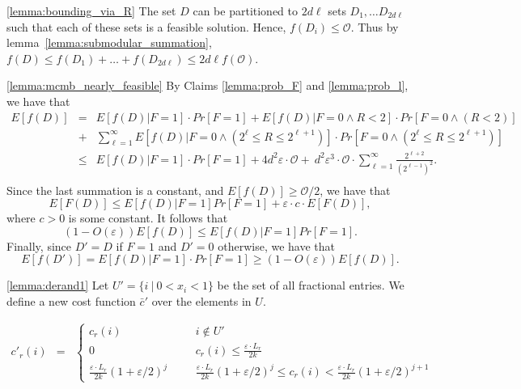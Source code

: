 \documentclass[11pt]{article}
\newcommand{\eps}{\varepsilon}
\newcommand{\bc}{\bar{c}}
\newcommand{\mO}{\mathcal{O}}
\newcommand{\Prb}[1]{{Pr\left[ #1\right] }}
\newenvironment{dl_proof}[1]{\noindent{\bf Proof of Lemma #1:}}{
 \hspace*{\fill} $\Box$ \vskip \belowdisplayskip}
\newenvironment{dl_claim_proof}[1]{\noindent{\bf Proof of Claim #1:}}{
 \hspace*{\fill} $\Box$ \vskip \belowdisplayskip}
\begin{document}
{\begin{dl_claim_proof}{\ref{lemma:bounding_via_R}}
The set $D$ can be partitioned to $2 d \ell$ sets
$D_1, \ldots D_{2 d \ell}$ such that each of these
sets is a feasible solution. Hence, $f(D_i) \leq \mO$.
Thus by lemma~\ref{lemma:submodular_summation}, $f(D) \leq f(D_1) +\ldots +f(D_{2 d \ell})
\leq 2 d \ell f(\mO)$.
\end{dl_claim_proof}



\begin{dl_claim_proof}{\ref{lemma:mcmb_nearly_feasible}}
By Claims \ref{lemma:prob_F} and \ref{lemma:prob_l}, we have that
\begin{eqnarray*}
E[f(D)]    &=&
E\left[f(D) | F=1\right] \cdot \Prb{F=1} +
 E\left[f(D) | F=0 \land R < 2 \right]\cdot \Prb{F=0 \land (R   < 2)} \\
   &+& \sum_{\ell=1}^{\infty}  E\left[f(D)|  F=0 \land (2 ^\ell \leq R \leq 2^{\ell+1})\right]
        \cdot
         \Prb{F=0 \land (2 ^\ell \leq R \leq 2^{\ell+1})} \\
 &\leq& E[f(D) | F=1] \cdot \Prb{F=1} + 4d^2 \eps \cdot \mO
+ ~d^2 \eps ^3 \cdot \mO \cdot \sum_{\ell=1}^{\infty}  \frac{2^{\ell+2}}
      { (2^{\ell-1})^2 }. \\
 \end{eqnarray*}
Since the last summation is a constant, and $E[f(D)]\geq \mO/2$, we have that
 $$E[F(D)] \leq E[f(D) | F=1 ] \Prb{F=1} + \eps \cdot c \cdot E[F(D)],$$
where $c>0$ is some constant. It follows that
 $$(1-O(\eps)) E[f(D)] \leq E[f(D) | F=1 ] \Prb{F=1}.$$
Finally, since $D' = D$ if $F=1$ and $D' =0$ otherwise, we have that
$$E[f(D')] = E[f(D)|F=1] \cdot \Prb{F=1} \geq (1- O(\eps)) E[f(D)]. $$
 \end{dl_claim_proof}



\begin{dl_proof}{\ref{lemma:derand1}}
Let $U' = \{ i~ |~ 0 < x_i < 1\}$ be the set of all fractional entries.
We define a new cost function $\bc'$ over the elements in $U$.

\[
\begin{array}{lcr}
c'_r(i) &=& \left\{
\begin{array}{lcl}
c_r(i) &~~~~ &i\notin U' \\
0 & &c_r(i) \leq \frac{\eps \cdot L_r}{2k}\\
\frac{\eps \cdot L_r}{2k} (1+\eps/2)^j & &
\frac{\eps \cdot L_r}{2k} (1+\eps/2)^j \leq c_r(i)<\frac{\eps \cdot L_r}{2k} (1+\eps/2)^{j+1}
\end{array}
\right.
\end{array}
\]


\end{dl_proof}}
\end{document}
